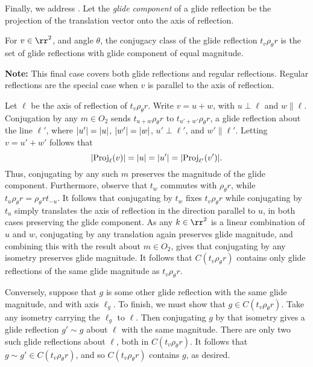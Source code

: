 \documentclass{scrartcl}
\begin{document}
\begin{solution}
        Finally, we address . Let the \textit{glide component} of a glide reflection be the projection of the translation vector onto the axis of reflection.
        \begin{lemma}
        For $v\in \rr^2$, and angle $\theta$, the conjugacy class of the glide reflection $t_v\rho_\theta r$ is the set of glide reflections with glide component of equal magnitude.
        \end{lemma}
        \textbf{Note:} This final case covers both glide reflections and regular reflections. Regular reflections are the special case when $v$ is parallel to the axis of reflection.
        \begin{subproof}
        Let $\ell$ be the axis of reflection of $t_v\rho_\theta r$. Write $v=u+w$, with $u\perp \ell$ and $w\parallel \ell$. Conjugation by any $m\in O_2$ sends $t_{u+w}\rho_\theta r$ to $t_{u'+w'}\rho_\theta r$, a glide reflection about the line $\ell'$, where $\lvert u'\rvert=\lvert u\rvert$, $\lvert w'\rvert=\lvert w\rvert$, $u'\perp \ell'$, and $w'\parallel \ell'$. Letting $v=u'+w'$ follows that
        \[\lvert\operatorname{Proj}_\ell(v)\rvert=\lvert u\rvert=\lvert u'\rvert=\lvert\operatorname{Proj}_{\ell'}(v')\rvert.\] Thus, conjugating by any such $m$ preserves the magnitude of the glide component. Furthermore, observe that $t_w$ commutes with $\rho_\theta r$, while $t_u\rho_\theta r=\rho_\theta rt_{-u}$. It follows that conjugating by $t_w$ fixes $t_v\rho_\theta r$ while conjugating by $t_u$ simply translates the axis of reflection in the direction parallel to $u$, in both cases preserving the glide component. As any $k\in \rr^2$ is a linear combination of $u$ and $w$, conjugating by any translation again preserves glide magnitude, and combining this with the result about $m\in O_2$, gives that conjugating by any isometry preserves glide magnitude. It follows that $C(t_v\rho_\theta r)$ contains only glide reflections of the same glide magnitude as $t_v\rho_\theta r$.
        
        Conversely, suppose that $g$ is some other glide reflection with the same glide magnitude, and with axis $\ell_g$. To finish, we must show that $g\in C(t_v\rho_\theta r)$. Take any isometry carrying the $\ell_g$ to $\ell$. Then conjugating $g$ by that isometry gives a glide reflection $g'\sim g$ about $\ell$ with the same magnitude. There are only two such glide reflections about $\ell$, both in $C(t_v\rho_\theta r)$. It follows that $g\sim g'\in C(t_v\rho_\theta r)$, and so $C(t_v\rho_\theta r)$ contains $g$, as desired.
        \end{subproof}
    

\end{solution}
\end{document}
